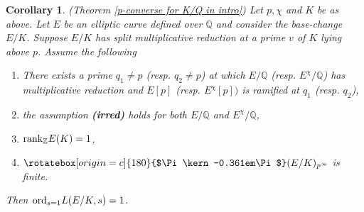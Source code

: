 \documentclass[reqno,10pt]{amsart}
\newcommand{\q}{\mathbb{Q}}
\newcommand{\z}{\mathbb{Z}}
\newcommand{\Varpi}{\rotatebox[origin=c]{180}{$\Pi\kern-0.361em\Pi$}}
\theoremstyle{plain}
\newtheorem{cor}[thm]{Corollary}
\theoremstyle{definition}
\begin{document}
\iffalse
\begin{cor} \label{p-converse over K/Q} (Theorem \ref{p-converse for K/Q in intro})
     Let $p, \chi$ and $K $ be as above.  Let $E$ be an elliptic curve defined over $\q$ and consider the base-change $E/K$. Suppose $E/K$ has split multiplicative reduction at a prime $v$ of $K$ lying above $p$. Assume the following
    \begin{enumerate}
        \item There exists a prime $q_1 \neq p$ (resp. $q_2 \neq p$) at which $E/\q$ (resp. $E^\chi/\q$) has multiplicative reduction and $E[p]$ (resp. $E^\chi[p])$ is ramified at $q_1$ (resp. $q_2$),

        \item the assumption \textbf{(irred)} holds for both $E/\q$ and $E^\chi/\q$,

        \item $\mathrm{rank}_\z \hspace{0.1mm} E(K) = 1$,
        
        \item $\Varpi(E/K)_{p^\infty}$ is finite.
    \end{enumerate}
    Then $\mathrm{ord}_{s=1} \hspace{0.1mm} L(E/K,s) = 1$.
\end{cor}
\end{document}
